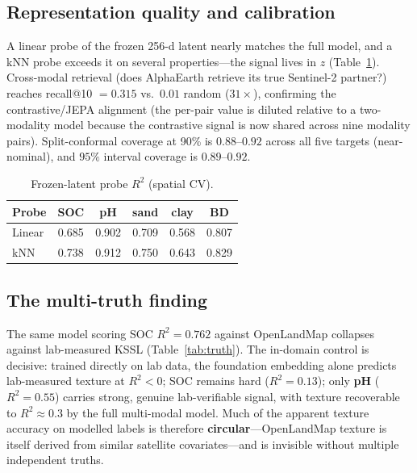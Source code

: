 \documentclass[11pt]{article}
\begin{document}
\subsection{Representation quality and calibration}
A linear probe of the frozen 256-d latent nearly matches the full model, and a kNN
probe exceeds it on several properties---the signal lives in $z$
(Table~\ref{tab:probe}). Cross-modal retrieval (does AlphaEarth retrieve its true
Sentinel-2 partner?) reaches recall@10 $=0.315$ vs.\ $0.01$ random ($31\times$), confirming
the contrastive/JEPA alignment (the per-pair value is diluted relative to a
two-modality model because the contrastive signal is now shared across nine
modality pairs). Split-conformal coverage at 90\% is $0.88$--$0.92$ across all five
targets (near-nominal), and $95\%$ interval coverage is $0.89$--$0.92$.

\begin{table}[H]\centering\small
\caption{Frozen-latent probe $R^2$ (spatial CV).}
\label{tab:probe}
\begin{tabular}{lccccc}
\toprule
Probe & SOC & pH & sand & clay & BD \\
\midrule
Linear & 0.685 & 0.902 & 0.709 & 0.568 & 0.807 \\
kNN    & 0.738 & 0.912 & 0.750 & 0.643 & 0.829 \\
\bottomrule
\end{tabular}
\end{table}

\subsection{The multi-truth finding}
The same model scoring SOC $R^2=0.762$ against OpenLandMap collapses against
lab-measured KSSL (Table~\ref{tab:truth}). The in-domain control is decisive: trained
directly on lab data, the foundation embedding alone predicts lab-measured texture at
$R^2<0$; SOC remains hard ($R^2=0.13$); only \textbf{pH} ($R^2=0.55$) carries strong,
genuine lab-verifiable signal, with texture recoverable to $R^2\approx0.3$ by the full
multi-modal model. Much of the apparent texture accuracy on modelled
labels is therefore \textbf{circular}---OpenLandMap texture is itself derived from
similar satellite covariates---and is invisible without multiple independent truths.
\end{document}
